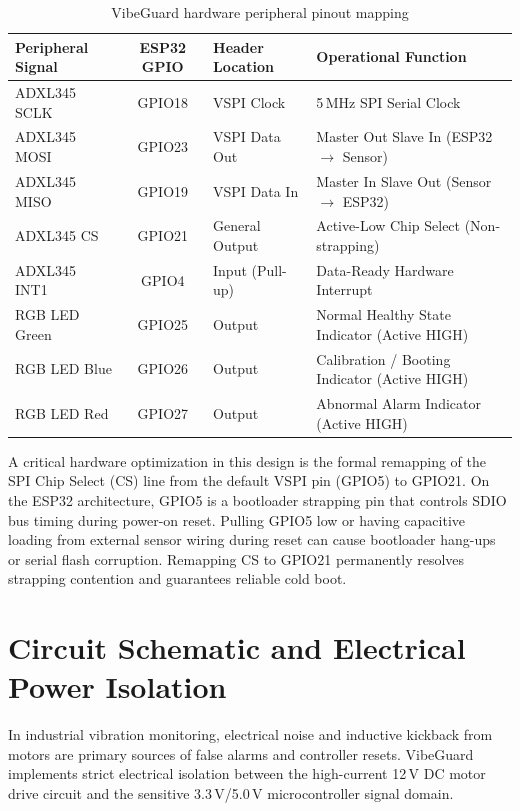 \begin{table}[H]
\centering
\caption{VibeGuard hardware peripheral pinout mapping}
\label{tab:pinout}
\small
\begin{tabularx}{\textwidth}{l c l X}
\toprule
\textbf{Peripheral Signal} & \textbf{ESP32 GPIO} & \textbf{Header Location} & \textbf{Operational Function} \\
\midrule
ADXL345 SCLK & GPIO18 & VSPI Clock & 5\,MHz SPI Serial Clock \\
ADXL345 MOSI & GPIO23 & VSPI Data Out & Master Out Slave In (ESP32 $\to$ Sensor) \\
ADXL345 MISO & GPIO19 & VSPI Data In & Master In Slave Out (Sensor $\to$ ESP32) \\
ADXL345 CS & GPIO21 & General Output & Active-Low Chip Select (Non-strapping) \\
ADXL345 INT1 & GPIO4 & Input (Pull-up) & Data-Ready Hardware Interrupt \\
\midrule
RGB LED Green & GPIO25 & Output & Normal Healthy State Indicator (Active HIGH) \\
RGB LED Blue & GPIO26 & Output & Calibration / Booting Indicator (Active HIGH) \\
RGB LED Red & GPIO27 & Output & Abnormal Alarm Indicator (Active HIGH) \\
\bottomrule
\end{tabularx}
\end{table}

\hspace{2em}A critical hardware optimization in this design is the formal remapping of the SPI Chip Select (CS) line from the default VSPI pin (GPIO5) to GPIO21. On the ESP32 architecture, GPIO5 is a bootloader strapping pin that controls SDIO bus timing during power-on reset. Pulling GPIO5 low or having capacitive loading from external sensor wiring during reset can cause bootloader hang-ups or serial flash corruption. Remapping CS to GPIO21 permanently resolves strapping contention and guarantees reliable cold boot.

\section{Circuit Schematic and Electrical Power Isolation}
\hspace{2em}In industrial vibration monitoring, electrical noise and inductive kickback from motors are primary sources of false alarms and controller resets. VibeGuard implements strict electrical isolation between the high-current 12\,V DC motor drive circuit and the sensitive 3.3\,V/5.0\,V microcontroller signal domain.

